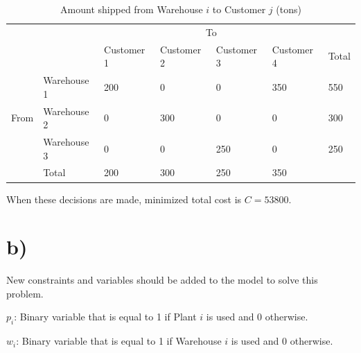 \documentclass{article}
\begin{document}
\begin{table}[!ht]
    \caption{Amount shipped from Warehouse $i$ to Customer $j$ (tons)}
    \begin{tabular}{ll|lllll}
    \cline{3-6}
                               &             & \multicolumn{4}{c|}{To}                                                                                                                                            \\ \cline{2-7} 
    \multicolumn{1}{l|}{}      &             & \multicolumn{1}{l|}{Customer 1} & \multicolumn{1}{l|}{Customer 2} & \multicolumn{1}{l|}{Customer 3} & \multicolumn{1}{l|}{Customer 4} & \multicolumn{1}{l|}{Total} \\ \hline
    \multicolumn{1}{|l|}{}     & Warehouse 1 & \multicolumn{1}{l|}{200}        & \multicolumn{1}{l|}{0}          & \multicolumn{1}{l|}{0}          & \multicolumn{1}{l|}{350}        & \multicolumn{1}{l|}{550}   \\ \cline{2-7} 
    \multicolumn{1}{|l|}{From} & Warehouse 2 & \multicolumn{1}{l|}{0}          & \multicolumn{1}{l|}{300}        & \multicolumn{1}{l|}{0}          & \multicolumn{1}{l|}{0}          & \multicolumn{1}{l|}{300}   \\ \cline{2-7} 
    \multicolumn{1}{|l|}{}     & Warehouse 3 & \multicolumn{1}{l|}{0}          & \multicolumn{1}{l|}{0}          & \multicolumn{1}{l|}{250}        & \multicolumn{1}{l|}{0}          & \multicolumn{1}{l|}{250}   \\ \hline
    \multicolumn{1}{l|}{}      & Total       & \multicolumn{1}{l|}{200}        & \multicolumn{1}{l|}{300}        & \multicolumn{1}{l|}{250}        & \multicolumn{1}{l|}{350}        &                            \\ \cline{2-6}
    \end{tabular}
\end{table}

When these decisions are made, minimized total cost is $C = 53800$.

\section*{b)}
New constraints and variables should be added to the model to solve this problem.

$p_{i}$: Binary variable that is equal to 1 if Plant $i$ is used and 0 otherwise. 

$w_{i}$: Binary variable that is equal to 1 if Warehouse $i$ is used and 0 otherwise.
\end{document}
